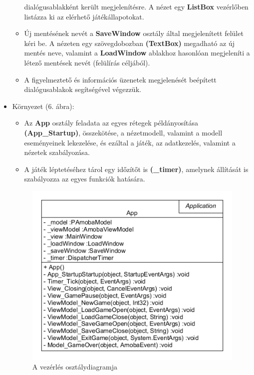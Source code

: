 \documentclass[11pt,a4paper]{article}
\begin{document}
\begin{itemize}
\begin{itemize}
		dialógusablakként került megjelenítésre. A nézet egy \textbf{ListBox} vezérlőben
		listázza ki az elérhető játékállapotokat.
		\item Új mentésének nevét a \textbf{SaveWindow} osztály által megjelenített felület
		kéri be. A nézeten egy szövegdobozban \textbf{(TextBox)} megadható az új mentés neve,
		valamint a \textbf{LoadWindow} ablakhoz hasonlóan megjeleníti a létező mentések nevét
		(felülírás céljából).
		\item A figyelmeztető és információs üzenetek megjelenését beépített dialógusablakok
		segítségével végezzük.
	\end{itemize}
	\item Környezet (6. ábra):
	\begin{itemize}
		\item Az \textbf{App} osztály feladata az egyes rétegek példányosítása
		\textbf{(App\_Startup)}, összekötése, a nézetmodell, valamint a modell eseményeinek lekezelése,
		és ezáltal a játék, az adatkezelés, valamint a nézetek szabályozása.
		\item A játék léptetéséhez tárol egy időzítőt is \textbf{(\_timer)}, amelynek állítását is
		szabályozza az egyes funkciók hatására.
	\end{itemize}
	\begin{figure}[h]
		\centering
		\includegraphics[width=11cm]{UMLs/App.png}
		\caption{A vezérlés osztálydiagramja}
	\end{figure}

\end{itemize}
\end{document}
